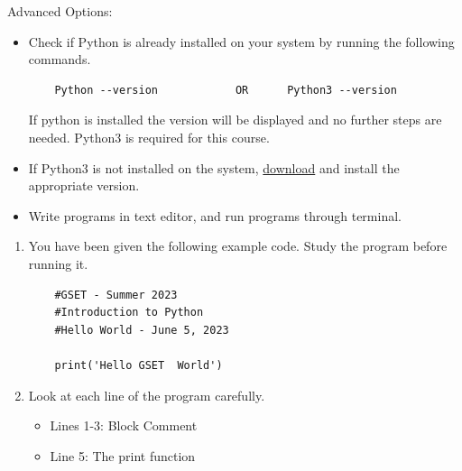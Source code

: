 \documentclass[12pt]{article}
\begin{document}
\begin{description}[labelindent=1cm]
Advanced Options:
\begin{itemize}

	\item Check if Python is already installed on your system by running the following commands.

	\begin{lstlisting} 
	Python --version 			OR 		Python3 --version
	\end{lstlisting}

	If python is installed the version will be displayed and no further steps are needed. Python3 is required for this course. 

	\item If Python3 is not installed on the system, \href{https://www.python.org/downloads/}{download} and install the appropriate version. 
		
	\item Write programs in text editor, and run programs through terminal.

\end{itemize}	
\newpage

\item[\textbf{\underline{Part 2 - The Python Code:}}] \hfill \vspace{0mm}
\begin{enumerate}
    \item You have been given the following example code. Study the program before running it.
	\begin{lstlisting}
	#GSET - Summer 2023
	#Introduction to Python  
	#Hello World - June 5, 2023

	print('Hello GSET  World')
	\end{lstlisting}

	\item	
Look at each line of the program carefully.
	\begin{itemize}
		\item Lines 1-3: Block Comment 
		\item Line 5: The print function
	\end{itemize}
	
\end{enumerate}

	\item[\textbf{\underline{Part 3 - Testing:}}] \hfill \vspace{0mm}
	\begin{enumerate}
	

\end{enumerate}
\end{description}
\end{document}
